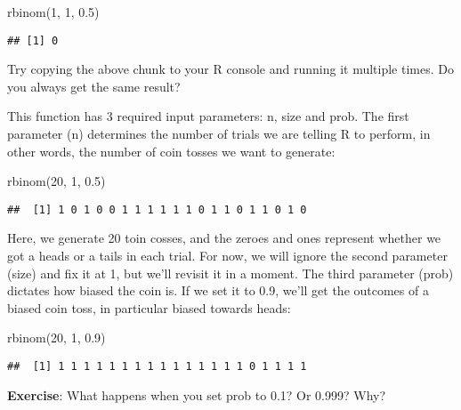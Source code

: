 \documentclass[
]{book}
\newenvironment{Shaded}{\begin{snugshade}}{\end{snugshade}}
\newcommand{\DecValTok}[1]{\textcolor[rgb]{0.00,0.00,0.81}{#1}}
\newcommand{\FloatTok}[1]{\textcolor[rgb]{0.00,0.00,0.81}{#1}}
\newcommand{\FunctionTok}[1]{\textcolor[rgb]{0.00,0.00,0.00}{#1}}
\newcommand{\NormalTok}[1]{#1}
\begin{document}
\begin{Shaded}
\begin{Highlighting}[]
\FunctionTok{rbinom}\NormalTok{(}\DecValTok{1}\NormalTok{, }\DecValTok{1}\NormalTok{, }\FloatTok{0.5}\NormalTok{)}
\end{Highlighting}
\end{Shaded}

\begin{verbatim}
## [1] 0
\end{verbatim}

Try copying the above chunk to your R console and running it multiple times. Do you always get the same result?

This function has 3 required input parameters: n, size and prob. The first parameter (n) determines the number of trials we are telling R to perform, in other words, the number of coin tosses we want to generate:

\begin{Shaded}
\begin{Highlighting}[]
\FunctionTok{rbinom}\NormalTok{(}\DecValTok{20}\NormalTok{, }\DecValTok{1}\NormalTok{, }\FloatTok{0.5}\NormalTok{)}
\end{Highlighting}
\end{Shaded}

\begin{verbatim}
##  [1] 1 0 1 0 0 1 1 1 1 1 1 0 1 1 0 1 1 0 1 0
\end{verbatim}

Here, we generate 20 toin cosses, and the zeroes and ones represent whether we got a heads or a tails in each trial. For now, we will ignore the second parameter (size) and fix it at 1, but we'll revisit it in a moment. The third parameter (prob) dictates how biased the coin is. If we set it to 0.9, we'll get the outcomes of a biased coin toss, in particular biased towards heads:

\begin{Shaded}
\begin{Highlighting}[]
\FunctionTok{rbinom}\NormalTok{(}\DecValTok{20}\NormalTok{, }\DecValTok{1}\NormalTok{, }\FloatTok{0.9}\NormalTok{)}
\end{Highlighting}
\end{Shaded}

\begin{verbatim}
##  [1] 1 1 1 1 1 1 1 1 1 1 1 1 1 1 1 0 1 1 1 1
\end{verbatim}

\textbf{Exercise}: What happens when you set prob to 0.1? Or 0.999? Why?
\end{document}
